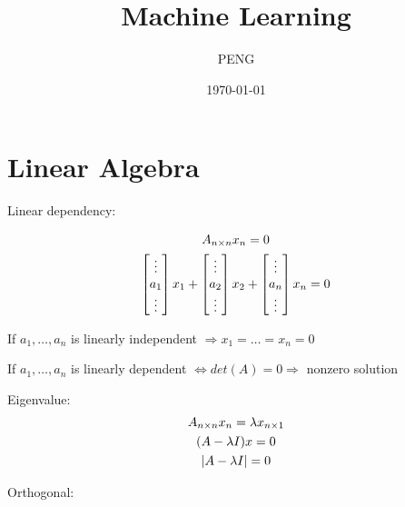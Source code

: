 \documentclass{article}
\title{Machine Learning}
\author{PENG}
\date{\today}
\begin{document}
\maketitle
\tableofcontents
\section{Linear Algebra}
\begin{definition}
    Linear dependency:

    \begin{gather*}
        A_{n \times n} x_{n \time 1} = 0 \\
        \begin{bmatrix}\vdots \\ a_{1} \\ \vdots\end{bmatrix} x_{1}
        + \begin{bmatrix}\vdots \\ a_{2} \\ \vdots\end{bmatrix} x_{2}
        + \begin{bmatrix}\vdots \\ a_{n} \\ \vdots\end{bmatrix} x_{n} = 0
    \end{gather*}

    If $a_{1}, \dots, a_{n}$ is linearly independent $\Rightarrow x_{1} = \dots = x_{n} = 0$

    If $a_{1}, \dots, a_{n}$ is linearly dependent $\Leftrightarrow det(A) = 0 \Rightarrow$ nonzero solution
\end{definition}

\begin{definition}
    Eigenvalue:
    \begin{gather}
        A_{n \times n}x_{n \time 1} = \lambda x_{n \times 1} \label{eq:eigen-value} \\
        (A - \lambda I) x = 0 \nonumber \\
        |A - \lambda I| = 0
    \end{gather}

\end{definition}

\begin{definition}
    Orthogonal:
\end{definition}
\end{document}
